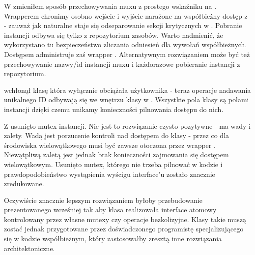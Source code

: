 W  zmieniłem sposób przechowywania muxu z prostego wskaźniku na . Wrapperem  chronimy osobno wejście i wyjście narażone na współbieżny dostęp z  - zauważ jak naturalne staje się odseparowanie sekcji krytycznych w . Pobranie instancji  odbywa się tylko z repozytorium zasobów. Warto nadmienić, że wykorzystano tu bezpieczeństwo zliczania odniesień  dla wywołań współbieżnych. Dostępem administruje zaś wrapper . Alternatywnym rozwiązaniem może być też przechowywanie nazwy/id instancji muxu i każdorazowe pobieranie instancji z repozytorium.

 wchłonął klasę  która wyłącznie obciążała użytkownika - teraz operacje nadawania unikalnego ID odbywają się we wnętrzu klasy w . Wszystkie pola klasy są polami instancji dzięki czemu unikamy konieczności pilnowania dostępu do nich.

Z  usunięto mutex instancji. Nie jest to rozwiązanie czysto pozytywne - ma wady i zalety. Wadą jest porzucenie kontroli nad dostępem do klasy - przez co dla środowiska wielowątkowego musi być zawsze otoczona przez wrapper . Niewątpliwą zaletą jest jednak brak konieczności zajmowania się dostępem wielowątkowym. Usunięto mutex, którego nie trzeba pilnować w kodzie i prawdopodobieństwo wystąpienia wyścigu interface'u zostało znacznie zredukowane.

Oczywiście znacznie lepszym rozwiązaniem byłoby przebudowanie prezentowanego wcześniej  tak aby klasa realizowała interface atomowy kontrolowany przez własne mutexy czy operacje bezkolizyjne. Klasy takie muszą zostać jednak przygotowane przez doświadczonego programistę specjalizującego się w kodzie współbieżnym, który zastosowałby zresztą inne rozwiązania architektoniczne.
